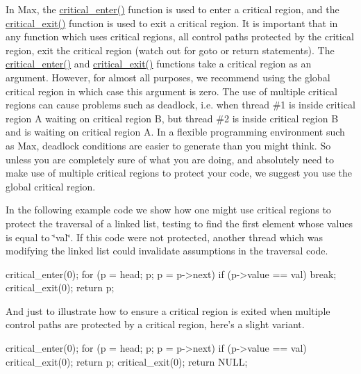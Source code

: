 In Max, the \hyperlink{group__critical_ga246445cffc822f756ac6fb34a055022d}{critical\_\-enter()} function is used to enter a critical region, and the \hyperlink{group__critical_ga269f46fef96f91143fc1616a4105984c}{critical\_\-exit()} function is used to exit a critical region. It is important that in any function which uses critical regions, all control paths protected by the critical region, exit the critical region (watch out for goto or return statements). The \hyperlink{group__critical_ga246445cffc822f756ac6fb34a055022d}{critical\_\-enter()} and \hyperlink{group__critical_ga269f46fef96f91143fc1616a4105984c}{critical\_\-exit()} functions take a critical region as an argument. However, for almost all purposes, we recommend using the global critical region in which case this argument is zero. The use of multiple critical regions can cause problems such as deadlock, i.e. when thread \#1 is inside critical region A waiting on critical region B, but thread \#2 is inside critical region B and is waiting on critical region A. In a flexible programming environment such as Max, deadlock conditions are easier to generate than you might think. So unless you are completely sure of what you are doing, and absolutely need to make use of multiple critical regions to protect your code, we suggest you use the global critical region.

In the following example code we show how one might use critical regions to protect the traversal of a linked list, testing to find the first element whose values is equal to \char`\"{}val\char`\"{}. If this code were not protected, another thread which was modifying the linked list could invalidate assumptions in the traversal code.


\begin{DoxyCode}
    critical_enter(0); 
    for (p = head; p; p = p->next) { 
        if (p->value == val) 
            break; 
    } 
    critical_exit(0); 
    return p;
\end{DoxyCode}


And just to illustrate how to ensure a critical region is exited when multiple control paths are protected by a critical region, here's a slight variant.


\begin{DoxyCode}
    critical_enter(0); 
    for (p = head; p; p = p->next) { 
        if (p->value == val) { 
            critical_exit(0); 
            return p; 
        } 
    } 
    critical_exit(0); 
    return NULL;
\end{DoxyCode}


